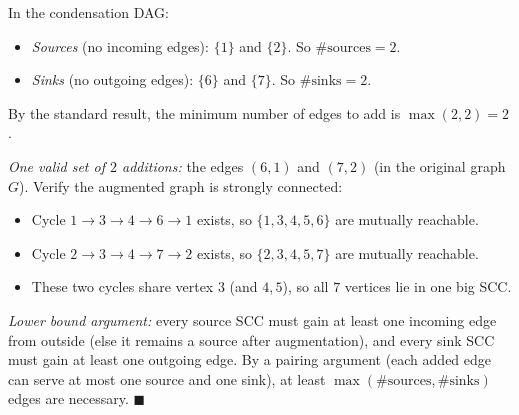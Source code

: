 \documentclass[test,letterpaper]{cs20}
\begin{document}
\begin{problem}
\begin{solution}
\subsolution In the condensation DAG:
\begin{itemize}
\item \emph{Sources} (no incoming edges): $\{1\}$ and $\{2\}$. So $\#\text{sources} = 2$.
\item \emph{Sinks} (no outgoing edges): $\{6\}$ and $\{7\}$. So $\#\text{sinks} = 2$.
\end{itemize}
By the standard result, the minimum number of edges to add is $\max(2, 2) = 2$.

\emph{One valid set of $2$ additions:} the edges $(6, 1)$ and $(7, 2)$ (in the original graph $G$). Verify the augmented graph is strongly connected:
\begin{itemize}
\item Cycle $1 \to 3 \to 4 \to 6 \to 1$ exists, so $\{1, 3, 4, 5, 6\}$ are mutually reachable.
\item Cycle $2 \to 3 \to 4 \to 7 \to 2$ exists, so $\{2, 3, 4, 5, 7\}$ are mutually reachable.
\item These two cycles share vertex $3$ (and $4, 5$), so all $7$ vertices lie in one big SCC.
\end{itemize}

\emph{Lower bound argument:} every source SCC must gain at least one incoming edge from outside (else it remains a source after augmentation), and every sink SCC must gain at least one outgoing edge. By a pairing argument (each added edge can serve at most one source and one sink), at least $\max(\#\text{sources}, \#\text{sinks})$ edges are necessary. $\blacksquare$
\end{solution}

\pagebreak

\end{problem}
\end{document}
